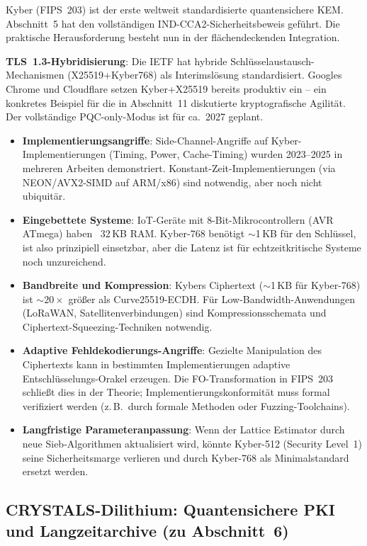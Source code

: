 ﻿\documentclass[a4paper,12pt]{article}
\theoremstyle{definition}
\begin{document}
Kyber (FIPS~203) ist der erste weltweit standardisierte quantensichere
KEM. Abschnitt~5 hat den vollständigen IND-CCA2-Sicherheitsbeweis
geführt. Die praktische Herausforderung besteht nun in der
flächendeckenden Integration.

\textbf{TLS~1.3-Hybridisierung}: Die IETF hat hybride
Schlüsselaustausch-Mechanismen (X25519+Kyber768) als Interimslösung
standardisiert. Googles Chrome und Cloudflare setzen Kyber+X25519
bereits produktiv ein -- ein konkretes Beispiel für die in Abschnitt~11
diskutierte kryptografische Agilität. Der vollständige PQC-only-Modus
ist für ca.\ 2027 geplant.

\begin{itemize}
  \item \textbf{Implementierungsangriffe}: Side-Channel-Angriffe auf
    Kyber-Implementierungen (Timing, Power, Cache-Timing) wurden
    2023--2025 in mehreren Arbeiten demonstriert.
    Konstant-Zeit-Implementierungen (via NEON/AVX2-SIMD auf ARM/x86)
    sind notwendig, aber noch nicht ubiquitär.
  \item \textbf{Eingebettete Systeme}: IoT-Geräte mit 8-Bit-Mikro\-controllern
    (AVR ATmega) haben ~32\,KB RAM. Kyber-768 benötigt $\sim$1\,KB
    für den Schlüssel, ist also prinzipiell einsetzbar, aber die
    Latenz ist für echtzeitkritische Systeme noch unzureichend.
  \item \textbf{Bandbreite und Kompression}: Kybers Ciphertext
    ($\sim$1\,KB für Kyber-768) ist $\sim$$20\times$ größer als
    Curve25519-ECDH. Für Low-Bandwidth-Anwendungen (LoRaWAN,
    Satellitenverbindungen) sind Kompressionsschemata und
    Ciphertext-Squeezing-Tech\-niken notwendig.
  \item \textbf{Adaptive Fehldekodierungs-Angriffe}: Gezielte
    Manipulation des Ciphertexts kann in bestimmten
    Implementierungen adaptive Entschlüsselungs-Orakel erzeugen.
    Die FO-Transformation in FIPS~203 schließt dies in der Theorie;
    Implementierungskonformität muss formal verifiziert werden
    (z.\,B.\ durch formale Methoden oder Fuzzing-Toolchains).
  \item \textbf{Langfristige Parameteranpassung}: Wenn der Lattice
    Estimator durch neue Sieb-Algorithmen aktualisiert wird,
    könnte Kyber-512 (Security Level~1) seine Sicherheitsmarge
    verlieren und durch Kyber-768 als Minimalstandard ersetzt werden.
\end{itemize}

\subsection{CRYSTALS-Dilithium: Quantensichere PKI und Langzeitarchive (zu Abschnitt~6)}
\end{document}
